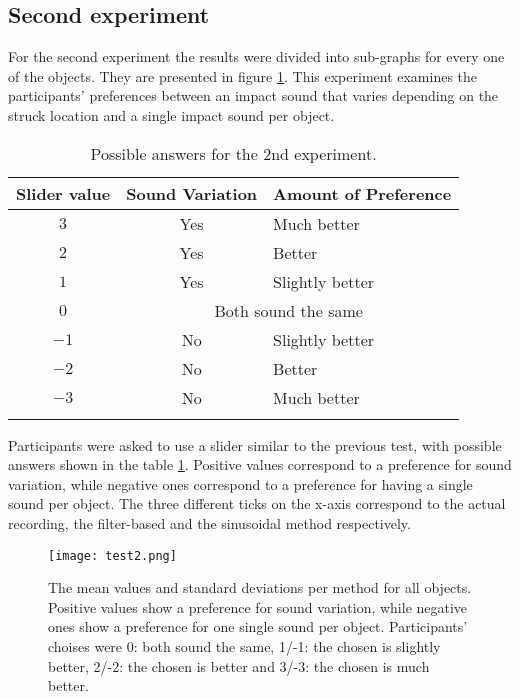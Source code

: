 \subsection{Second experiment}
For the second experiment the results were divided into sub-graphs for every one of the objects. They are presented in figure \ref{fig:test2}. This experiment examines the participants' preferences between an impact sound that varies depending on the struck location and a single impact sound per object.

\begin{table}[H]
	\centering
    \begin{tabular}{  c  c  l  }
    \toprule
    \textbf{Slider value} & \textbf{Sound Variation} & \textbf{Amount of Preference} \\ \toprule
    \addlinespace
    $3$ & Yes & Much better \\ 
    $2$ & Yes & Better \\ 
    $1$ & Yes & Slightly better \\ 
    \addlinespace
    $0$ & \multicolumn{2}{c}{Both sound the same} \\ 
    \addlinespace
    $-1$ & No & Slightly better \\ 
    $-2$ & No & Better \\ 
    $-3$ & No & Much better \\
    \addlinespace
    \bottomrule
    \end{tabular}
    \caption{Possible answers for the 2nd experiment.}
    \label{tab:test2_ans}
\end{table}

Participants were asked to use a slider similar to the previous test, with possible answers shown in the table \ref{tab:test2_ans}. Positive values correspond to a preference for sound variation, while negative ones correspond to a preference for having a single sound per object. The three different ticks on the x-axis correspond to the actual recording, the filter-based and the sinusoidal method respectively. %

\begin{figure}[H]
  \centering
    \texttt{[image: test2.png]}
      \caption{The mean values and standard deviations per method for all objects. Positive values show a preference for sound variation, while negative ones show a preference for one single sound per object. Participants' choises were 0: both sound the same, 1/-1: the chosen is slightly better, 2/-2: the chosen is better and 3/-3: the chosen is much better.}\label{fig:test2}
\end{figure}

